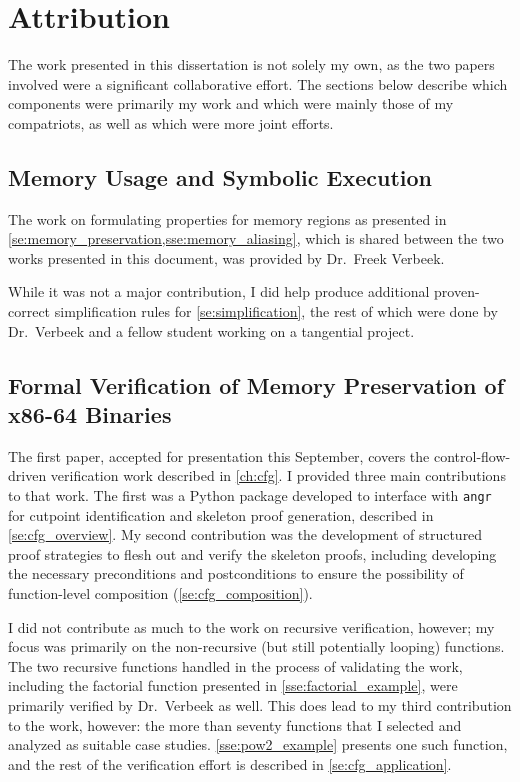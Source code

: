 \chapter{Attribution}\label{attribution}
The work presented in this dissertation is not solely my own,
as the two papers involved were a significant collaborative effort.
The sections below describe which components were primarily my work
and which were mainly those of my compatriots, as well as which were more joint efforts.

\section*{Memory Usage and Symbolic Execution}
The work on formulating properties for memory regions
as presented in \cref{se:memory_preservation,sse:memory_aliasing},
which is shared between the two works presented in this document,
was provided by Dr.~Freek Verbeek.

While it was not a major contribution,
I did help produce additional proven-correct simplification rules
for \cref{se:simplification},
the rest of which were done by Dr.~Verbeek
and a fellow student working on a tangential project.

\section*{Formal Verification of Memory Preservation of x86-64 Binaries}\label{attribute1}
The first paper, accepted for presentation this September,
covers the control-flow-driven verification work described in \cref{ch:cfg}.
I provided three main contributions to that work.
The first was a Python package developed to interface with \texttt{angr}
for cutpoint identification and skeleton proof generation,
described in \cref{se:cfg_overview}.
My second contribution was the development of structured proof strategies
to flesh out and verify the skeleton proofs,
including developing the necessary preconditions and postconditions to ensure
the possibility of function-level composition (\cref{se:cfg_composition}).

I did not contribute as much to the work on recursive verification, however;
my focus was primarily on the non-recursive (but still potentially looping) functions.
The two recursive functions handled in the process of validating the work,
including the factorial function presented in \cref{sse:factorial_example},
were primarily verified by Dr.~Verbeek as well.
This does lead to my third contribution to the work, however:
the more than seventy functions that I selected and analyzed as suitable case studies.
\cref{sse:pow2_example} presents one such function,
and the rest of the verification effort is described in \cref{se:cfg_application}.

